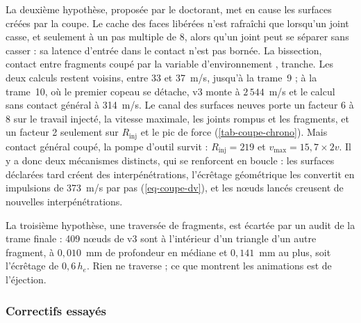La deuxième hypothèse, proposée par le doctorant, met en cause les surfaces créées par la coupe. Le cache des faces libérées n'est rafraîchi que lorsqu'un joint casse, et seulement à un pas multiple de 8, alors qu'un joint peut se séparer sans casser : sa latence d'entrée dans le contact n'est pas bornée. La bissection, contact entre fragments coupé par la variable d'environnement , tranche. Les deux calculs restent voisins, entre 33 et 37~m/s, jusqu'à la trame~9 ; à la trame~10, où le premier copeau se détache, v3 monte à $2\,544$~m/s et le calcul sans contact général à 314~m/s. Le canal des surfaces neuves porte un facteur 6 à 8 sur le travail injecté, la vitesse maximale, les joints rompus et les fragments, et un facteur 2 seulement sur $R_\text{inj}$ et le pic de force (\cref{tab-coupe-chrono}). Mais contact général coupé, la pompe d'outil survit : $R_\text{inj} = 219$ et $v_\text{max} = 15{,}7 \times 2v$. Il y a donc deux mécanismes distincts, qui se renforcent en boucle : les surfaces déclarées tard créent des interpénétrations, l'écrêtage géométrique les convertit en impulsions de 373~m/s par pas (\cref{eq-coupe-dv}), et les nœuds lancés creusent de nouvelles interpénétrations.

La troisième hypothèse, une traversée de fragments, est écartée par un audit de la trame finale : 409 nœuds de v3 sont à l'intérieur d'un triangle d'un autre fragment, à $0{,}010$~mm de profondeur en médiane et $0{,}141$~mm au plus, soit l'écrêtage de $0{,}6\,h_e$. Rien ne traverse ; ce que montrent les animations est de l'éjection.

\subsubsection{Correctifs essayés}


